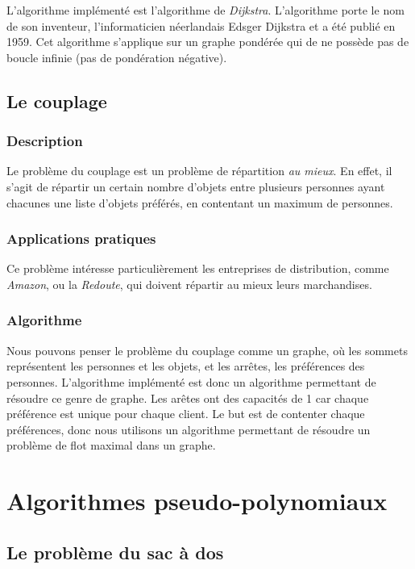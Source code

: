 	L'algorithme implémenté est l'algorithme de \emph{Dijkstra}. L'algorithme porte le nom de son inventeur, 
	l'informaticien néerlandais Edsger Dijkstra et a été publié en 1959. Cet algorithme s'applique sur un graphe pondérée 
	qui de ne possède pas de boucle infinie (pas de pondération négative).

    \subsection{Le couplage}
        \subsubsection{Description}
            Le problème du couplage est un problème de répartition \emph{au mieux}.
            En effet, il s'agit de répartir un certain nombre d'objets
            entre plusieurs personnes ayant chacunes une liste d'objets
            préférés, en contentant un maximum de personnes.
        \subsubsection{Applications pratiques}
            Ce problème intéresse particulièrement les entreprises
            de distribution, comme \emph{Amazon},
            ou la \emph{Redoute}, qui doivent
            répartir au mieux leurs marchandises.
        \subsubsection{Algorithme}
		Nous pouvons penser le problème du couplage comme un graphe,
		 où les sommets représentent les personnes et les objets,
		 et les arrêtes, les préférences des personnes.
		L'algorithme implémenté est donc un algorithme permettant
		 de résoudre ce genre de graphe.
		Les arêtes ont des capacités de 1 car chaque préférence est unique
		 pour chaque client.
		Le but est de contenter chaque préférences, donc nous utilisons un
		 algorithme permettant de résoudre un problème de flot maximal
		 dans un graphe.



\section{Algorithmes pseudo-polynomiaux}
    \subsection{Le problème du sac à dos}
